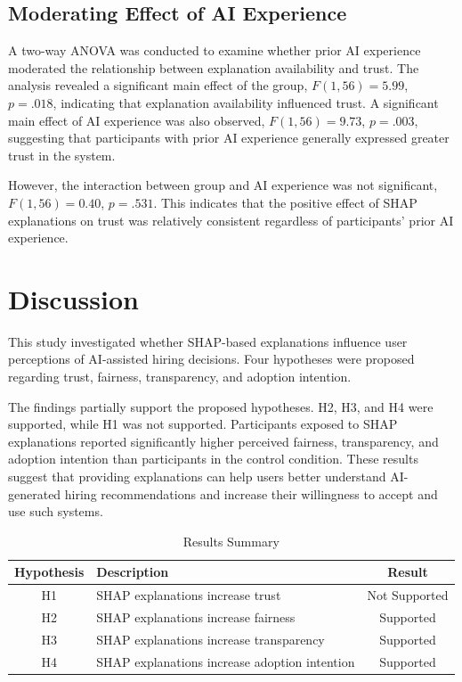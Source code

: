 \documentclass[conference]{IEEEtran}
\begin{document}
\subsection{Moderating Effect of AI Experience}

A two-way ANOVA was conducted to examine whether prior AI experience moderated the relationship between explanation availability and trust. The analysis revealed a significant main effect of the group, $F(1,56) = 5.99$, $p = .018$, indicating that explanation availability influenced trust. A significant main effect of AI experience was also observed, $F(1,56) = 9.73$, $p = .003$, suggesting that participants with prior AI experience generally expressed greater trust in the system.

However, the interaction between group and AI experience was not significant, $F(1,56) = 0.40$, $p = .531$. This indicates that the positive effect of SHAP explanations on trust was relatively consistent regardless of participants' prior AI experience.

\section{Discussion}

This study investigated whether SHAP-based explanations influence user perceptions of AI-assisted hiring decisions. Four hypotheses were proposed regarding trust, fairness, transparency, and adoption intention.

The findings partially support the proposed hypotheses. H2, H3, and H4 were supported, while H1 was not supported. Participants exposed to SHAP explanations reported significantly higher perceived fairness, transparency, and adoption intention than participants in the control condition. These results suggest that providing explanations can help users better understand AI-generated hiring recommendations and increase their willingness to accept and use such systems.

\begin{table}[htbp]
\caption{Results Summary}
\begin{center}
\begin{tabular}{|c|p{3.7cm}|c|}
\hline
\textbf{Hypothesis} & \textbf{Description} & \textbf{Result} \\
\hline
H1 & SHAP explanations increase trust & Not Supported \\
\hline
H2 & SHAP explanations increase fairness & Supported \\
\hline
H3 & SHAP explanations increase transparency & Supported \\
\hline
H4 & SHAP explanations increase adoption intention & Supported \\
\hline
\end{tabular}
\label{tab:hypothesissummary}
\end{center}
\end{table}
\end{document}
